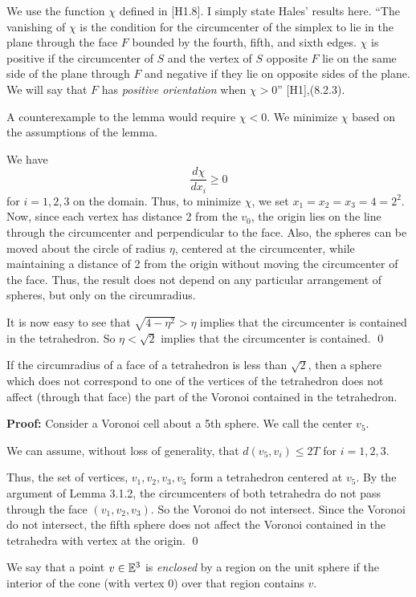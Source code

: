 We use the function $\chi$ defined in [H1.8]. 
I simply state Hales' results here.
``The vanishing of $\chi$ is the condition for the
circumcenter of the simplex to lie
in the plane through the face $F$
bounded by the fourth,
fifth, and sixth edges.  $\chi$ is positive if the circumcenter of
$S$ and the vertex of $S$ opposite $F$ lie on the same side of the
plane through $F$ and negative if they lie on opposite sides
of the plane.  We will say that $F$ has {\it positive orientation\/}
when $\chi>0$''  [H1],(8.2.3).

A counterexample to the lemma would require $\chi < 0$.  We minimize $\chi$ based on the 
assumptions of the lemma.

We have $$\frac {d\chi}{dx_i}\geq 0$$ for $i=1,2,3$ on the domain.  Thus, to minimize $\chi$,
 we set $x_1=x_2=x_3=4=2^2$.  Now, since each vertex has distance 2 from the $v_0$, 
the origin lies on the line through the circumcenter and perpendicular to the face.  
Also, the spheres can be moved about the circle of radius $\eta$, centered at the circumcenter,
 while maintaining a distance of 2 from the origin without moving the circumcenter of the face. 
 Thus, the result does not depend on any particular arrangement of spheres, but only on the 
circumradius.  

It is now easy to see that $\sqrt{4-\eta^2} > \eta$ implies that the circumcenter is
 contained in the tetrahedron.  So $\eta < \sqrt 2$ implies that the circumcenter is 
contained.  \qed

 If the circumradius of a face of a tetrahedron is less than $\sqrt 2$,
 then a sphere which does not correspond to one of the vertices of the tetrahedron does not 
affect (through that face) the part of the Voronoi contained in the tetrahedron. \endproclaim

{\bf Proof:} Consider a Voronoi cell about a 5th sphere.  We call the center $v_5$.  

We can assume, without loss of generality, that $d(v_5,v_i)\le 2T$ for $i=1,2,3$. 

Thus, the set of vertices, $v_1,v_2,v_3,v_5$ form a tetrahedron centered at $v_5$.  
By the argument of Lemma 3.1.2, the circumcenters of both tetrahedra do not pass through the face $(v_1,v_2,v_3)$.  So the Voronoi do not intersect.  Since the Voronoi do not intersect, the fifth sphere does not affect the 
Voronoi contained in the tetrahedra with vertex at the origin.  \qed

\bigskip

We say that a point $v\in{\Bbb E}^3$ is {\it enclosed\/} by a region
on the unit sphere if the interior of the cone 
(with vertex $0$) over that region contains
$v$. 

